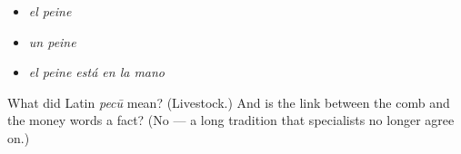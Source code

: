 \begin{itemize}
\raggedright
  \item \emph{el peine}
  \item \emph{un peine}
  \item \emph{el peine está en la mano}
\end{itemize}

\begin{tcolorbox}[breakable,colback=teal!4,colframe=teal!35!black,title={Before you move on}]
What did Latin \emph{pecū} mean? (Livestock.) And is the link between the comb and the money words a fact? (No — a long tradition that specialists no longer agree on.)
\end{tcolorbox}
